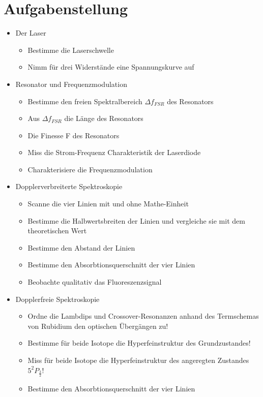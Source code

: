 \documentclass[12pt]{article}
\begin{document}
\section{Aufgabenstellung}
\begin{itemize}
 \item Der Laser
  \begin{itemize}
   \item Bestimme die Laserschwelle 
   \item Nimm für drei Widerstände eine Spannungskurve auf
  \end{itemize}
 \item Resonator und Frequenzmodulation
  \begin{itemize}
   \item Bestimme den freien Spektralbereich $\Delta f_{FSR}$ des Resonators
   \item Aus $\Delta f_{FSR}$ die Länge des Resonators
   \item Die Finesse F des Resonators
   \item Miss die Strom-Frequenz Charakteristik der Laserdiode
   \item Charakterisiere die Frequenzmodulation
  \end{itemize}
 \item Dopplerverbreiterte Spektroskopie
  \begin{itemize}
   \item Scanne die vier Linien mit und ohne Mathe-Einheit
   \item Bestimme die Halbwertsbreiten der Linien und vergleiche sie mit dem theoretischen Wert
   \item Bestimme den Abstand der Linien
   \item Bestimme den Absorbtionsquerschnitt der vier Linien
   \item Beobachte qualitativ das Fluoreszenzsignal
  \end{itemize}
 \item Dopplerfreie Spektroskopie
  \begin{itemize}
   \item Ordne die Lambdips und Crossover-Resonanzen anhand des Termschemas von Rubidium den optischen Übergängen zu!
   \item Bestimme für beide Isotope die Hyperfeinstruktur des Grundzustandes!
   \item Miss für beide Isotope die Hyperfeinstruktur des angeregten Zustandes $5^2P_{\frac{3}{2}}$!
   \item Bestimme den Absorbtionsquerschnitt der vier Linien

\end{itemize}
\end{itemize}
\end{document}
